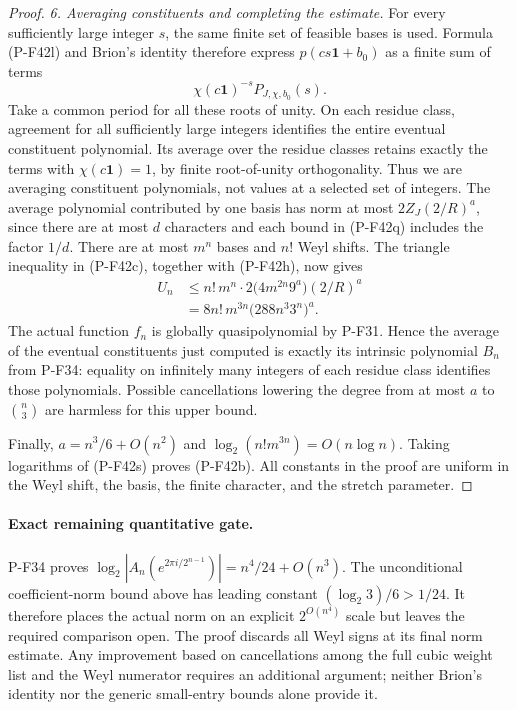 \documentclass[11pt,a4paper]{article}
\begin{document}
\begin{proof}
\emph{6. Averaging constituents and completing the estimate.}
For every sufficiently large integer $s$, the same finite
set of feasible bases is used. Formula (P-F42l) and Brion's
identity therefore express $p(cs\mathbf1+b_0)$ as a finite
sum of terms
\[
              \chi(c\mathbf1)^{-s}P_{J,\chi,b_0}(s).
 \tag{P-F42r}
\]
Take a common period for all these roots of unity.
On each residue class, agreement for all sufficiently large
integers identifies the entire eventual constituent
polynomial. Its average over the residue classes retains
exactly the terms with $\chi(c\mathbf1)=1$, by finite
root-of-unity orthogonality. Thus we are averaging
constituent polynomials, not values at a selected set of
integers.
The average polynomial contributed by one basis has norm
at most $2Z_J(2/R)^a$, since there are at most $d$ characters
and each bound in (P-F42q) includes the factor $1/d$.
There are at most $m^n$ bases and $n!$ Weyl shifts.
The triangle inequality in (P-F42c), together with
(P-F42h), now gives
\[
 \begin{split}
 U_n
 &\le n!\,m^n\cdot
          2\bigl(4m^{2n}9^a\bigr)(2/R)^a\\
 &=8n!\,m^{3n}\bigl(288n^3 3^n\bigr)^a.
 \end{split}
 \tag{P-F42s}
\]
The actual function $f_n$ is globally quasipolynomial by
P-F31. Hence the average of the eventual constituents
just computed is exactly its intrinsic polynomial $B_n$
from P-F34: equality on infinitely many integers of
each residue class identifies those polynomials.
Possible cancellations lowering the degree from at most
$a$ to $\binom n3$ are harmless for this upper bound.

Finally, $a=n^3/6+O(n^2)$ and
$\log_2(n!m^{3n})=O(n\log n)$.
Taking logarithms of (P-F42s) proves (P-F42b).
All constants in the proof are uniform in the Weyl shift,
the basis, the finite character, and the stretch parameter.
\end{proof}

\paragraph{Exact remaining quantitative gate.}
P-F34 proves
$\log_2|A_n(e^{2\pi i/2^{n-1}})|=n^4/24+O(n^3)$.
The unconditional coefficient-norm bound above has leading
constant $(\log_2 3)/6>1/24$.
It therefore places the actual norm on an explicit
$2^{O(n^4)}$ scale but leaves the required comparison open.
The proof discards all Weyl signs at its final norm estimate.
Any improvement based on cancellations among the full cubic
weight list and the Weyl numerator requires an additional
argument; neither Brion's identity nor the generic
small-entry bounds alone provide it.
\end{document}
